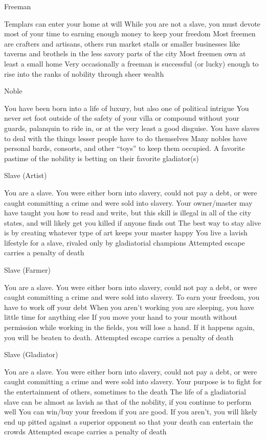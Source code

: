 Freeman

    Templars can enter your home at will
    While you are not a slave, you must devote most of your time to earning enough money to keep your freedom
    Most freemen are crafters and artisans, others run market stalls or smaller businesses like taverns and brothels in the less savory parts of the city
    Most freemen own at least a small home
    Very occasionally a freeman is successful (or lucky) enough to rise into the ranks of nobility through sheer wealth

Noble

    You have been born into a life of luxury, but also one of political intrigue
    You never set foot outside of the safety of your villa or compound without your guards, palanquin to ride in, or at the very least a good disguise.
    You have slaves to deal with the things lesser people have to do themselves
    Many nobles have personal bards, consorts, and other “toys” to keep them occupied.
    A favorite pastime of the nobility is betting on their favorite gladiator(s)

Slave (Artist)

    You are a slave. You were either born into slavery, could not pay a debt, or were caught committing a crime and were sold into slavery.
    Your owner/master may have taught you how to read and write, but this skill is illegal in all of the city states, and will likely get you killed if anyone finds out
    The best way to stay alive is by creating whatever type of art keeps your master happy
    You live a lavish lifestyle for a slave, rivaled only by gladiatorial champions
    Attempted escape carries a penalty of death

Slave (Farmer)

    You are a slave. You were either born into slavery, could not pay a debt, or were caught committing a crime and were sold into slavery.
    To earn your freedom, you have to work off your debt
    When you aren’t working you are sleeping, you have little time for anything else
    If you move your hand to your mouth without permission while working in the fields, you will lose a hand. If it happens again, you will be beaten to death.
    Attempted escape carries a penalty of death

Slave (Gladiator)

    You are a slave. You were either born into slavery, could not pay a debt, or were caught committing a crime and were sold into slavery.
    Your purpose is to fight for the entertainment of others, sometimes to the death
    The life of a gladiatorial slave can be almost as lavish as that of the nobility, if you continue to perform well
    You can win/buy your freedom if you are good. If you aren’t, you will likely end up pitted against a superior opponent so that your death can entertain the crowds
    Attempted escape carries a penalty of death


